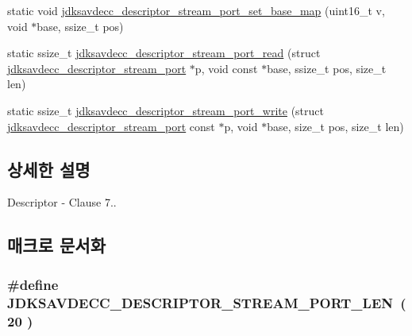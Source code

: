 \begin{DoxyCompactItemize}
\item 
static void \hyperlink{group__descriptor__stream__port_gacd3176cf921b5df3231ce0390b231465}{jdksavdecc\+\_\+descriptor\+\_\+stream\+\_\+port\+\_\+set\+\_\+base\+\_\+map} (uint16\+\_\+t v, void $\ast$base, ssize\+\_\+t pos)
\item 
static ssize\+\_\+t \hyperlink{group__descriptor__stream__port_gadd062af797579a2aab567969f19b35d9}{jdksavdecc\+\_\+descriptor\+\_\+stream\+\_\+port\+\_\+read} (struct \hyperlink{structjdksavdecc__descriptor__stream__port}{jdksavdecc\+\_\+descriptor\+\_\+stream\+\_\+port} $\ast$p, void const $\ast$base, ssize\+\_\+t pos, size\+\_\+t len)
\item 
static ssize\+\_\+t \hyperlink{group__descriptor__stream__port_ga56f8b0752df170ed1901f7fdd44b998f}{jdksavdecc\+\_\+descriptor\+\_\+stream\+\_\+port\+\_\+write} (struct \hyperlink{structjdksavdecc__descriptor__stream__port}{jdksavdecc\+\_\+descriptor\+\_\+stream\+\_\+port} const $\ast$p, void $\ast$base, size\+\_\+t pos, size\+\_\+t len)
\end{DoxyCompactItemize}


\subsection{상세한 설명}
Descriptor -\/ Clause 7.. 

\subsection{매크로 문서화}
\subsubsection[{\texorpdfstring{J\+D\+K\+S\+A\+V\+D\+E\+C\+C\+\_\+\+D\+E\+S\+C\+R\+I\+P\+T\+O\+R\+\_\+\+S\+T\+R\+E\+A\+M\+\_\+\+P\+O\+R\+T\+\_\+\+L\+EN}{JDKSAVDECC_DESCRIPTOR_STREAM_PORT_LEN}}]{\setlength{\rightskip}{0pt plus 5cm}\#define J\+D\+K\+S\+A\+V\+D\+E\+C\+C\+\_\+\+D\+E\+S\+C\+R\+I\+P\+T\+O\+R\+\_\+\+S\+T\+R\+E\+A\+M\+\_\+\+P\+O\+R\+T\+\_\+\+L\+EN~( 20 )}\hypertarget{group__descriptor__stream__port_ga1b3e49096f01beb5bfac0e22093adc0b}{}\label{group__descriptor__stream__port_ga1b3e49096f01beb5bfac0e22093adc0b}


